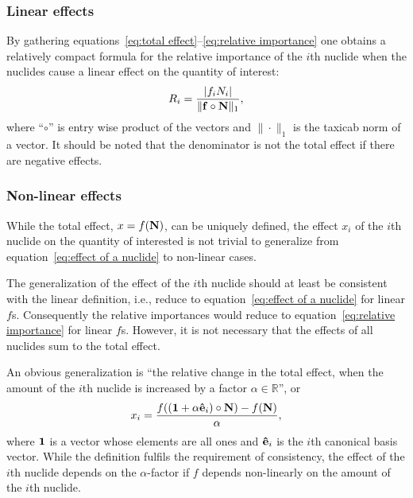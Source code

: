 \subsubsection*{Linear effects}

By gathering equations~\eqref{eq:total effect}--\eqref{eq:relative importance} one obtains a relatively compact formula for the relative importance of the $i$th nuclide when the nuclides cause a linear effect on the quantity of interest:
%
\begin{gather}
R_i = \frac{|f_iN_i|}{\|\mathbf{f} \circ \mathbf{N}\|_1},
\label{eq:relative importance for linear effects}
\end{gather}
%
where ``$\circ$'' is entry wise product of the vectors and $\|\cdot\|_1$ is the taxicab norm of a vector. It should be noted that the denominator is not the total effect if there are negative effects.

\subsubsection*{Non-linear effects}

While the total effect, $x=f(\mathbf{N})$, can be uniquely defined, the effect $x_i$ of the $i$th nuclide on the quantity of interested is not trivial to generalize from equation~\eqref{eq:effect of a nuclide} to non-linear cases.

The generalization of the effect of the $i$th nuclide should at least 
be consistent with the linear definition, i.e., reduce to equation~\eqref{eq:effect of a nuclide} for linear $f$s. Consequently the relative importances would reduce to equation~\eqref{eq:relative importance} for linear $f$s. 
However, it is not necessary that the effects of all nuclides sum to the total effect.

An obvious generalization is ``the relative change in the total effect, when the amount of the $i$th nuclide is increased by a factor $\alpha\in\mathbb{R}$'', or
%
\begin{gather}
x_i = \frac{f((\mathbf{1}+\alpha\mathbf{\hat{e}}_i) \circ \mathbf{N})-f(\mathbf{N})}{\alpha},
\label{eq:non-linear prototype 5}
\end{gather}
%
where $\mathbf{1}$ is a vector whose elements are all ones and $\mathbf{\hat{e}}_i$ is the $i$th canonical basis vector. While the definition fulfils the requirement of consistency, the effect of the $i$th nuclide depends on the $\alpha$-factor if $f$ depends non-linearly on the amount of the $i$th nuclide.

